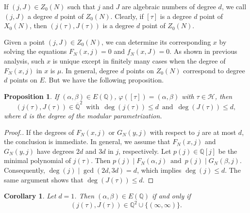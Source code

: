 \documentclass[10pt, a4paper]{article}
\newtheorem{proposition}[theorem]{Proposition}
\newtheorem{corollary}[theorem]{Corollary}
\begin{document}
If  $(j, J)\in Z_0(N)$ such that  $j$ and $J$ are algebraic numbers of degree $d$,  we call $(j, J)$ a  degree $d$ point of  $Z_0(N)$.  Clearly, if $[\tau]$ is a degree $d$ point of $X_0(N)$, then $(j(\tau), J(\tau))$ is a degree $d$ point of $Z_0(N)$\cite{Ad}.

Given a  point $(j,J) \in Z_0(N)$, we can determine its corresponding $x$  by solving the equations
 $F_N(x, j)=0$ and $f_N(x, J)=0$.  As shown in previous analysis,  such $x$ is unique except in finitely many cases when the degree of $F_N(x,j)$ in $x$ is $\mu$.   In general, degree $d$ points on $Z_0(N)$ correspond to degree $d$ points on $E$.   But we have the following  proposition.

\begin{proposition}
If $(\alpha,\beta) \in E(\mathbb{Q})$, $\varphi([\tau]) = (\alpha,\beta)$ with $\tau \in \mathcal{H}$, then
\[ (j(\tau),J(\tau)) \in \overline{\mathbb{Q}}^2\,\,\, \text{with} \,\,\, \deg(j(\tau)) \leq d \,\,\, \text{and} \,\,\, \deg(J(\tau)) \leq d, \]
where $d$  is the degree of the modular parametrization.
\end{proposition}

\begin{proof}[Proof.]
If the degrees of $F_N(x,j)$ or $G_N(y,j)$ with respect to $j$ are at most $d$, the conclusion is immediate. In general, we assume that  $F_N(x,j)$ and $G_N(y,j)$ have degrees $2d$ and $3d$ in $j$,  respectively.
Let $p(j) \in \mathbb{Q}[j]$ be the minimal polynomial of $j(\tau)$. Then
$p(j) \mid F_N(\alpha,j)  \,\,\, \text{and}  \,\,\, p(j) \mid G_N(\beta,j).$
Consequently, $\deg(j) \mid \gcd(2d,3d) = d$, which implies $\deg(j) \leq d$.
The same argument shows  that $\deg(J(\tau)) \leq d$.
\end{proof}

\begin{corollary}
Let $d=1$. Then  $(\alpha,\beta) \in E(\mathbb{Q})$ if and only if
\[ (j(\tau),J(\tau)) \in \mathbb{Q}^2 \cup \{(\infty,\infty)\}. \]
\end{corollary}
\end{document}
